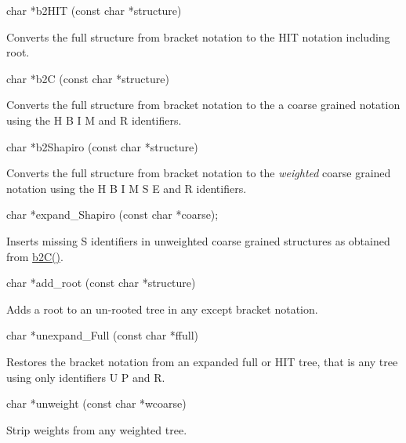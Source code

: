 \begin{DoxyVerb}char *b2HIT (const char *structure)
\end{DoxyVerb}
 Converts the full structure from bracket notation to the H\+IT notation including root.

\begin{DoxyVerb}char *b2C (const char *structure)
\end{DoxyVerb}
 Converts the full structure from bracket notation to the a coarse grained notation using the \textquotesingle{}H\textquotesingle{} \textquotesingle{}B\textquotesingle{} \textquotesingle{}I\textquotesingle{} \textquotesingle{}M\textquotesingle{} and \textquotesingle{}R\textquotesingle{} identifiers.

\begin{DoxyVerb}char *b2Shapiro (const char *structure)
\end{DoxyVerb}
 Converts the full structure from bracket notation to the {\itshape weighted} coarse grained notation using the \textquotesingle{}H\textquotesingle{} \textquotesingle{}B\textquotesingle{} \textquotesingle{}I\textquotesingle{} \textquotesingle{}M\textquotesingle{} \textquotesingle{}S\textquotesingle{} \textquotesingle{}E\textquotesingle{} and \textquotesingle{}R\textquotesingle{} identifiers.

\begin{DoxyVerb}char  *expand_Shapiro (const char *coarse);
\end{DoxyVerb}
 Inserts missing \textquotesingle{}S\textquotesingle{} identifiers in unweighted coarse grained structures as obtained from \mbox{\hyperlink{group__struct__utils_ga9c80d92391f2833549a8b6dac92233f0}{b2\+C()}}.

\begin{DoxyVerb}char *add_root (const char *structure)
\end{DoxyVerb}
 Adds a root to an un-\/rooted tree in any except bracket notation.

\begin{DoxyVerb}char  *unexpand_Full (const char *ffull)
\end{DoxyVerb}
 Restores the bracket notation from an expanded full or H\+IT tree, that is any tree using only identifiers \textquotesingle{}U\textquotesingle{} \textquotesingle{}P\textquotesingle{} and \textquotesingle{}R\textquotesingle{}.

\begin{DoxyVerb}char  *unweight (const char *wcoarse)
\end{DoxyVerb}
 Strip weights from any weighted tree.

